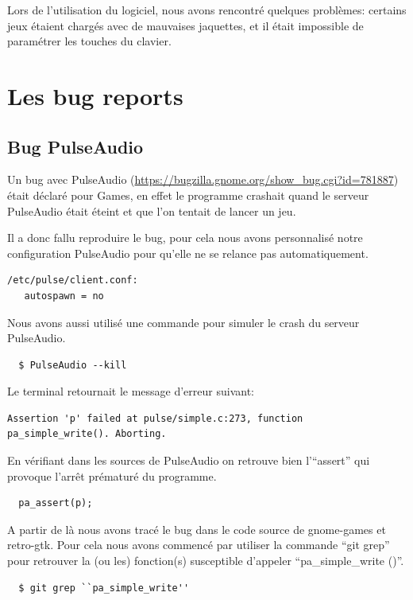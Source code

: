 \documentclass[12pt]{report}
\begin{document}
Lors de l'utilisation du logiciel, nous avons rencontré quelques
problèmes: certains jeux étaient chargés avec de mauvaises jaquettes,
et il était impossible de paramétrer les touches du clavier.

\section{Les bug reports}
\subsection{Bug PulseAudio}
\label{PulseAudio}
Un bug avec PulseAudio (\url{https://bugzilla.gnome.org/show_bug.cgi?id=781887})
était déclaré pour Games, en effet le programme crashait quand le serveur
PulseAudio était éteint et que l'on tentait de lancer un jeu.

Il a donc fallu reproduire le bug, pour cela nous avons personnalisé notre
configuration PulseAudio pour qu'elle ne se relance pas automatiquement.
\begin{verbatim}
/etc/pulse/client.conf:
   autospawn = no
\end{verbatim}

Nous avons aussi utilisé une commande pour simuler le crash du serveur PulseAudio.
\begin{verbatim}
  $ PulseAudio --kill
\end{verbatim}

Le terminal retournait le message d'erreur suivant:
\begin{verbatim}
Assertion 'p' failed at pulse/simple.c:273, function pa_simple_write(). Aborting.
\end{verbatim}

En vérifiant dans les sources de PulseAudio on retrouve bien l'``assert'' qui provoque
l’arrêt prématuré du programme.
\begin{verbatim}
  pa_assert(p);
\end{verbatim}

A partir de là nous avons tracé le bug dans le code source de gnome-games et retro-gtk.
Pour cela nous avons commencé par utiliser la commande ``git grep'' pour retrouver
la (ou les) fonction(s) susceptible d'appeler ``pa\_simple\_write ()''.
\begin{verbatim}
  $ git grep ``pa_simple_write''
\end{verbatim}
\end{document}
